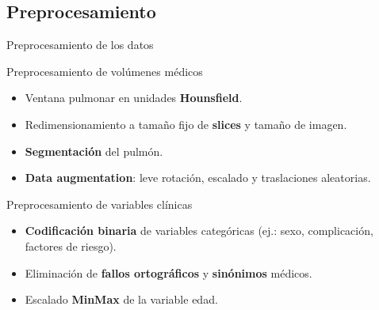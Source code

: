 \documentclass{beamer}
\begin{document}
\subsection{Preprocesamiento}
\begin{frame}{Preprocesamiento de los datos}

\begin{block}{Preprocesamiento de volúmenes médicos}
\begin{itemize}
    \item Ventana pulmonar en unidades \textbf{Hounsfield}.
    \item Redimensionamiento a tamaño fijo de \textbf{slices} y tamaño de imagen. 
    \item \textbf{Segmentación} del pulmón.
    \item \textbf{Data augmentation}: leve rotación, escalado y traslaciones aleatorias.
\end{itemize}
\end{block}

\vspace{0.5em}

\begin{block}{Preprocesamiento de variables clínicas}
\begin{itemize}
    \item \textbf{Codificación binaria} de variables categóricas (ej.: sexo, complicación, factores de riesgo).
    \item Eliminación de \textbf{fallos ortográficos} y \textbf{sinónimos} médicos.
    \item Escalado \textbf{MinMax} de la variable edad.
\end{itemize}
\end{block}
\end{frame}
\end{document}
